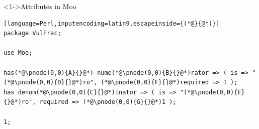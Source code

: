 \documentclass[ngerman,xcolor={table,dvipsnames},scriptsizeer,compress,hyperref={bookmarks,colorlinks}]{beamer}
\begin{document}
\begin{frame}[fragile]

\begin{block}<1->{Attributes in Moo}
\begin{lstlisting}[language=Perl,inputencoding=latin9,escapeinside={(*@}{@*)}]
package VulFrac;

use Moo;

has(*@\pnode(0,0){A}{}@*) nume(*@\pnode(0,0){B}{}@*)rator => ( is => "(*@\pnode(0,0){D}{}@*)ro", (*@\pnode(0,0){F}{}@*)required => 1 );
has denom(*@\pnode(0,0){C}{}@*)inator => ( is => "(*@\pnode(0,0){E}{}@*)ro", required => (*@\pnode(0,0){G}{}@*)1 );

1;
\end{lstlisting}
\end{block}

\begin{itemize}
\end{itemize}

\end{frame}
\end{document}
